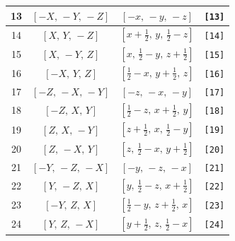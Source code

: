 \documentclass[fleqn,8pt]{jsarticle}
\begin{document}
\begin{longtable}{cccc}
13 & $\left[ - X,\, - Y,\, - Z \right]$ & $\left[ - x,\, - y,\, - z \right]$ & {\tt [13]} \\ \hline
14 & $\left[ X,\, Y,\, - Z \right]$ & $\left[ x + \frac{1}{2},\, y,\, \frac{1}{2} - z \right]$ & {\tt [14]} \\ \hline
15 & $\left[ X,\, - Y,\, Z \right]$ & $\left[ x,\, \frac{1}{2} - y,\, z + \frac{1}{2} \right]$ & {\tt [15]} \\ \hline
16 & $\left[ - X,\, Y,\, Z \right]$ & $\left[ \frac{1}{2} - x,\, y + \frac{1}{2},\, z \right]$ & {\tt [16]} \\ \hline
17 & $\left[ - Z,\, - X,\, - Y \right]$ & $\left[ - z,\, - x,\, - y \right]$ & {\tt [17]} \\ \hline
18 & $\left[ - Z,\, X,\, Y \right]$ & $\left[ \frac{1}{2} - z,\, x + \frac{1}{2},\, y \right]$ & {\tt [18]} \\ \hline
19 & $\left[ Z,\, X,\, - Y \right]$ & $\left[ z + \frac{1}{2},\, x,\, \frac{1}{2} - y \right]$ & {\tt [19]} \\ \hline
20 & $\left[ Z,\, - X,\, Y \right]$ & $\left[ z,\, \frac{1}{2} - x,\, y + \frac{1}{2} \right]$ & {\tt [20]} \\ \hline
21 & $\left[ - Y,\, - Z,\, - X \right]$ & $\left[ - y,\, - z,\, - x \right]$ & {\tt [21]} \\ \hline
22 & $\left[ Y,\, - Z,\, X \right]$ & $\left[ y,\, \frac{1}{2} - z,\, x + \frac{1}{2} \right]$ & {\tt [22]} \\ \hline
23 & $\left[ - Y,\, Z,\, X \right]$ & $\left[ \frac{1}{2} - y,\, z + \frac{1}{2},\, x \right]$ & {\tt [23]} \\ \hline
24 & $\left[ Y,\, Z,\, - X \right]$ & $\left[ y + \frac{1}{2},\, z,\, \frac{1}{2} - x \right]$ & {\tt [24]} \\
\end{longtable}
\end{document}
